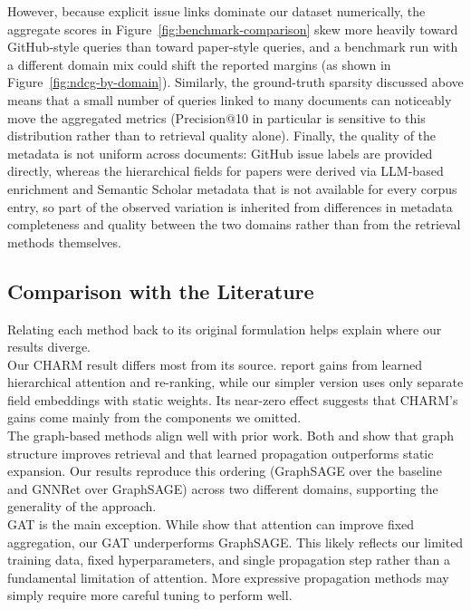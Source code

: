 \documentclass[11pt]{article}
\begin{document}
However, because explicit issue links dominate our dataset numerically, the aggregate scores in Figure~\ref{fig:benchmark-comparison} skew more heavily toward GitHub-style queries than toward paper-style queries, and a benchmark run with a different domain mix could shift the reported margins (as shown in Figure~\ref{fig:ndcg-by-domain}). Similarly, the ground-truth sparsity discussed above means that a small number of queries linked to many documents can noticeably move the aggregated metrics (Precision@10 in particular is sensitive to this distribution rather than to retrieval quality alone). Finally, the quality of the metadata is not uniform across documents: GitHub issue labels are provided directly, whereas the hierarchical fields for papers were derived via LLM-based enrichment and Semantic Scholar metadata that is not available for every corpus entry, so part of the observed variation is inherited from differences in metadata completeness and quality between the two domains rather than from the retrieval methods themselves.

\subsection{Comparison with the Literature}
Relating each method back to its original formulation helps explain where our results diverge.\\
Our CHARM result differs most from its source. \citet{freymuth_hierarchical_2025} report gains from learned hierarchical attention and re-ranking, while our simpler version uses only separate field embeddings with static weights. Its near-zero effect suggests that CHARM's gains come mainly from the components we omitted.\\
The graph-based methods align well with prior work. Both \citet{titiya_sage_2026} and \citet{li_graph_2024} show that graph structure improves retrieval and that learned propagation outperforms static expansion. Our results reproduce this ordering (GraphSAGE over the baseline and GNNRet over GraphSAGE) across two different domains, supporting the generality of the approach.\\
GAT is the main exception. While \citet{velickovic_graph_2018} show that attention can improve fixed aggregation, our GAT underperforms GraphSAGE. This likely reflects our limited training data, fixed hyperparameters, and single propagation step rather than a fundamental limitation of attention. More expressive propagation methods may simply require more careful tuning to perform well.
\end{document}
